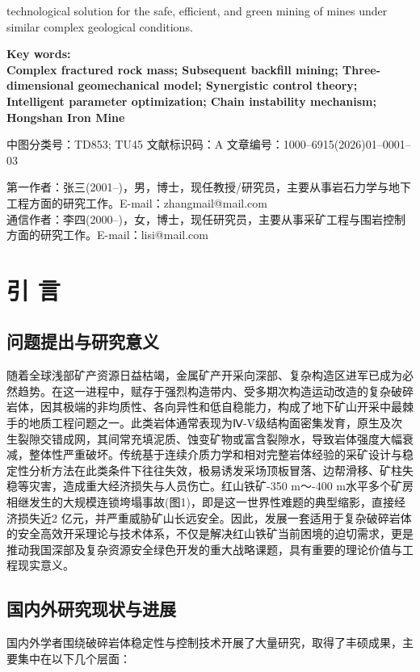 \documentclass[twocolumn,a4paper,10pt]{article}
\begin{document}
\begin{center}
technological solution for the safe, efficient, and green mining of mines under similar complex geological conditions.
\end{center}

\begin{center}
\small \bfseries Key words: \\
\small Complex fractured rock mass; Subsequent backfill mining; Three-dimensional geomechanical model; Synergistic control theory; Intelligent parameter optimization; Chain instability mechanism; Hongshan Iron Mine
\end{center}

\noindent \small 中图分类号：TD853; TU45           文献标识码：A       文章编号：1000–6915(2026)01–0001–03

\noindent \small 第一作者：张三(2001–)，男，博士，现任教授/研究员，主要从事岩石力学与地下工程方面的研究工作。E-mail：zhangmail@mail.com \\
\noindent \small *通信作者：李四(2000–)，女，博士，现任研究员，主要从事采矿工程与围岩控制方面的研究工作。E-mail：lisi@mail.com

\section{引 言}
\subsection{问题提出与研究意义}
随着全球浅部矿产资源日益枯竭，金属矿产开采向深部、复杂构造区进军已成为必然趋势\cite{1,2}。在这一进程中，赋存于强烈构造带内、受多期次构造运动改造的复杂破碎岩体，因其极端的非均质性、各向异性和低自稳能力，构成了地下矿山开采中最棘手的地质工程问题之一\cite{3,4}。此类岩体通常表现为Ⅳ-V级结构面密集发育，原生及次生裂隙交错成网，其间常充填泥质、蚀变矿物或富含裂隙水，导致岩体强度大幅衰减，整体性严重破坏\cite{5}。传统基于连续介质力学和相对完整岩体经验的采矿设计与稳定性分析方法在此类条件下往往失效，极易诱发采场顶板冒落、边帮滑移、矿柱失稳等灾害，造成重大经济损失与人员伤亡\cite{6,7}。红山铁矿-350 m～-400 m水平多个矿房相继发生的大规模连锁垮塌事故(图1)，即是这一世界性难题的典型缩影，直接经济损失近2 亿元，并严重威胁矿山长远安全\cite{8}。因此，发展一套适用于复杂破碎岩体的安全高效开采理论与技术体系，不仅是解决红山铁矿当前困境的迫切需求，更是推动我国深部及复杂资源安全绿色开发的重大战略课题，具有重要的理论价值与工程现实意义。

\subsection{国内外研究现状与进展}
国内外学者围绕破碎岩体稳定性与控制技术开展了大量研究，取得了丰硕成果，主要集中在以下几个层面：
\end{document}
